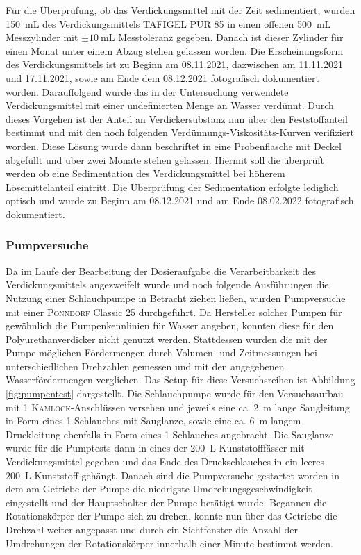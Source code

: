 Für die Überprüfung, ob das Verdickungsmittel mit der Zeit sedimentiert, wurden \SI{150}{\milli \liter} des Verdickungsmittels TAFIGEL PUR 85 in einen offenen \SI{500}{\milli \liter} Messzylinder mit $\pm \SI{10}{\milli \liter}$ Messtoleranz gegeben. Danach ist dieser Zylinder für einen Monat unter einem Abzug stehen gelassen worden. Die Erscheinungsform des Verdickungsmittels ist zu Beginn am 08.11.2021, dazwischen am 11.11.2021 und 17.11.2021, sowie am Ende dem 08.12.2021 fotografisch dokumentiert worden.\linebreak
Darauffolgend wurde das in der Untersuchung verwendete Verdickungsmittel mit einer undefinierten Menge an Wasser verdünnt. Durch dieses Vorgehen ist der Anteil an Verdickersubstanz nun über den Feststoffanteil bestimmt und mit den noch folgenden Verdünnungs-Viskositäts-Kurven verifiziert worden. Diese Lösung wurde dann beschriftet in eine Probenflasche mit Deckel abgefüllt und über zwei Monate stehen gelassen. Hiermit soll die überprüft werden ob eine Sedimentation des Verdickungsmittel bei höherem Lösemittelanteil eintritt. Die Überprüfung der Sedimentation erfolgte lediglich optisch und wurde zu Beginn am 08.12.2021 und am Ende 08.02.2022 fotografisch dokumentiert.

\subsubsection{Pumpversuche}
Da im Laufe der Bearbeitung der Dosieraufgabe die Verarbeitbarkeit des Verdickungsmittels angezweifelt wurde und noch folgende Ausführungen die Nutzung einer Schlauchpumpe in Betracht ziehen ließen, wurden Pumpversuche mit einer \textsc{Ponndorf} Classic 25 durchgeführt. Da Hersteller solcher Pumpen für gewöhnlich die Pumpenkennlinien für Wasser angeben, konnten diese für den Polyurethanverdicker nicht genutzt werden. Stattdessen wurden die mit der Pumpe möglichen Fördermengen durch Volumen- und Zeitmessungen bei unterschiedlichen Drehzahlen gemessen und mit den angegebenen Wasserfördermengen verglichen.\linebreak
Das Setup für diese Versuchsreihen ist Abbildung \ref{fig:pumpentest} dargestellt.  Die Schlauchpumpe wurde für den Versuchsaufbau mit \SI{1}{\zoll} \textsc{Kamlock}-Anschlüssen versehen und jeweils eine ca. \SI{2}{\meter} lange Saugleitung in Form eines \SI{1}{\zoll} Schlauches mit Sauglanze, sowie eine ca. \SI{6}{\meter} langem Druckleitung ebenfalls in Form eines \SI{1}{\zoll} Schlauches angebracht. Die Sauglanze wurde für die Pumptests dann in eines der \SI{200}{\liter}-Kunststofffässer mit Verdickungsmittel gegeben und das Ende des Druckschlauches in ein leeres \SI{200}{\liter}-Kunststoff gehängt. Danach sind die Pumpversuche gestartet worden in dem am Getriebe der Pumpe die niedrigste Umdrehungsgeschwindigkeit eingestellt und der Hauptschalter der Pumpe betätigt wurde. Begannen die Rotationskörper der Pumpe sich zu drehen, konnte nun über das Getriebe die Drehzahl weiter angepasst und durch ein Sichtfenster die Anzahl der Umdrehungen der Rotationskörper innerhalb einer Minute bestimmt werden.

